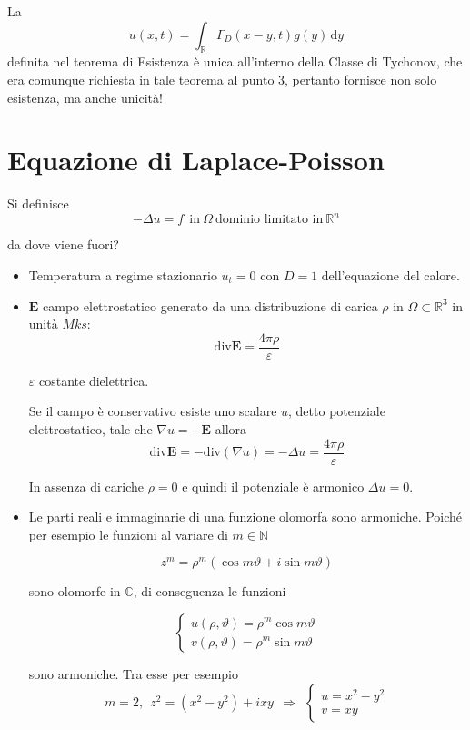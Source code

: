 \documentclass[10pt,a4paper,twoside,openright]{book}
\newcommand{\de}{\,\mathrm d}
\newcommand{\dy}{\de y}
\begin{document}
La
\begin{equation*}
u(x,t) =\int _{\mathbb{R}} \Gamma _{D}(x-y,t) g(y) \dy
\end{equation*}
definita nel teorema di Esistenza è unica all'interno della Classe di Tychonov, che era comunque richiesta in tale teorema al punto $3$, pertanto fornisce non solo esistenza, ma anche unicità!
\chapter{Equazione di Laplace-Poisson}
\begin{definition}
 Si definisce
\begin{equation*}
\boxed{-\Delta u=f} \ \ \text{in} \ \Omega \ \text{dominio limitato in} \ \mathbb{R}^{n}
\end{equation*}
\end{definition}
da dove viene fuori?
\begin{itemize}
\item Temperatura a regime stazionario $u_{t}=0$ con $D=1$ dell'equazione del calore.
\item $\mathbf{E}$ campo elettrostatico generato da una distribuzione di carica $\rho $ in $\Omega \subset \mathbb{R}^{3}$ in unità $Mks$:
\begin{equation*}
\mathrm{div}\mathbf{E} =\frac{4\pi \rho }{\varepsilon }
\end{equation*}

$\varepsilon $ costante dielettrica.

Se il campo è conservativo esiste uno scalare $u$, detto potenziale elettrostatico, tale che $\nabla u=-\mathbf{E}$ allora
\begin{equation*}
\mathrm{div}\mathbf{E} =-\mathrm{div}(\nabla u) =-\Delta u=\frac{4\pi \rho }{\varepsilon }
\end{equation*}

In assenza di cariche $\rho =0$ e quindi il potenziale è armonico $\Delta u=0$.
\item Le parti reali e immaginarie di una funzione olomorfa sono armoniche. Poiché per esempio le funzioni al variare di $m\in \mathbb{N}$

\begin{equation*}
z^{m} =\rho ^{m}(\cos m\vartheta +i\sin m\vartheta)
\end{equation*}

sono olomorfe in $\mathbb{C}$, di conseguenza le funzioni

\begin{equation*}
\begin{cases}
u(\rho,\vartheta) =\rho ^{m}\cos m\vartheta \\
v(\rho,\vartheta) =\rho ^{m}\sin m\vartheta 
\end{cases}
\end{equation*}

sono armoniche. Tra esse per esempio
\begin{equation*}
m=2,\ \ z^{2} =\left(x^{2} -y^{2}\right) +ixy\ \ \Rightarrow \ \ \begin{cases}
u=x^{2} -y^{2}\\
v=xy
\end{cases}
\end{equation*}
\end{itemize}
\end{document}
